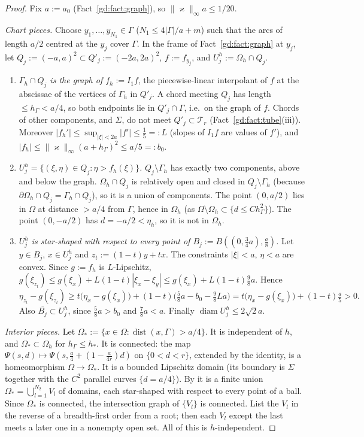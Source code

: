 \documentclass[11pt,reqno]{amsart}
\theoremstyle{plain}
\theoremstyle{definition}
\newcommand{\hG}{h_\Gamma}
\newcommand{\Gh}{\Gamma_h}
\newcommand{\Oh}{\Omega_h}
\newcommand{\norm}[1]{\lVert #1\rVert}
\DeclareMathOperator{\diam}{diam}
\DeclareMathOperator{\dist}{dist}
\newcommand{\kap}{\varkappa}            %
\newcommand{\kapi}{\norm{\kap}_\infty}
\newcommand{\Tr}{\mathcal T_r}
\begin{document}
\begin{proof}
Fix $a:=a_0$ (Fact~\ref{gd:fact:graph}), so $\kapi a\le1/20$.

\emph{Chart pieces.} Choose $y_1,\dots,y_{N_1}\in\Gamma$ ($N_1\le4|\Gamma|/a+m$) such that the arcs of length $a/2$ centred at the $y_j$ cover $\Gamma$. In the frame of Fact~\ref{gd:fact:graph} at $y_j$, let $Q_j:=(-a,a)^2\subset Q'_j:=(-2a,2a)^2$, $f:=f_{y_j}$, and $U_j^h:=\Oh\cap Q_j$.
\begin{enumerate}
\item \emph{$\Gh\cap Q_j$ is the graph of $f_h:=I_1f$}, the piecewise-linear interpolant of $f$ at the abscissae of the vertices of $\Gh$ in $Q'_j$. A chord meeting $Q_j$ has length $\le\hG<a/4$, so both endpoints lie in $Q'_j\cap\Gamma$, i.e.\ on the graph of $f$. Chords of other components, and $\Sigma$, do not meet $Q'_j\subset\Tr$ (Fact~\ref{gd:fact:tube}(iii)). Moreover $|f_h'|\le\sup_{|\xi|<2a}|f'|\le\frac15=:L$ (slopes of $I_1f$ are values of $f'$), and $|f_h|\le\kapi(a+\hG)^2\le a/5=:b_0$.
\item \emph{$U_j^h=\{(\xi,\eta)\in Q_j:\eta>f_h(\xi)\}$.} $Q_j\setminus\Gh$ has exactly two components, above and below the graph. $\Oh\cap Q_j$ is relatively open and closed in $Q_j\setminus\Gh$ (because $\partial\Oh\cap Q_j=\Gh\cap Q_j$), so it is a union of components. The point $(0,a/2)$ lies in $\Omega$ at distance $>a/4$ from $\Gamma$, hence in $\Oh$ (as $\Omega\setminus\Oh\subset\{d\le C\hG^2\}$). The point $(0,-a/2)$ has $d=-a/2<\eta_h$, so it is not in $\Oh$.
\item \emph{$U_j^h$ is star-shaped with respect to every point of $B_j:=B((0,\frac34a),\frac a8)$.} Let $y\in B_j$, $x\in U_j^h$ and $z_t:=(1-t)y+tx$. The constraints $|\xi|<a$, $\eta<a$ are convex. Since $g:=f_h$ is $L$-Lipschitz, $g(\xi_{z_t})\le g(\xi_x)+L(1-t)|\xi_x-\xi_y|\le g(\xi_x)+L(1-t)\tfrac98a$. Hence
\[
\eta_{z_t}-g(\xi_{z_t})\ge t\bigl(\eta_x-g(\xi_x)\bigr)+(1-t)\bigl(\tfrac58a-b_0-\tfrac98La\bigr)=t\bigl(\eta_x-g(\xi_x)\bigr)+(1-t)\tfrac a5>0 .
\]
Also $\overline{B_j}\subset U_j^h$, since $\frac58a>b_0$ and $\frac78a<a$. Finally $\diam U_j^h\le2\sqrt2a$.
\end{enumerate}

\emph{Interior pieces.} Let $\Omega_\ast:=\{x\in\Omega:\dist(x,\Gamma)>a/4\}$. It is independent of $h$, and $\Omega_\ast\subset\Oh$ for $\hG\le h_\ast$. It is connected: the map $\Psi(s,d)\mapsto\Psi(s,\frac a4+(1-\frac a{4r})d)$ on $\{0<d<r\}$, extended by the identity, is a homeomorphism $\Omega\to\Omega_\ast$. It is a bounded Lipschitz domain (its boundary is $\Sigma$ together with the $C^2$ parallel curves $\{d=a/4\}$). By \cite[Lemma~II.1.3]{Galdi} it is a finite union $\Omega_\ast=\bigcup_{l=1}^{N_2}V_l$ of domains, each star-shaped with respect to every point of a ball. Since $\Omega_\ast$ is connected, the intersection graph of $\{V_l\}$ is connected. List the $V_l$ in the reverse of a breadth-first order from a root; then each $V_l$ except the last meets a later one in a nonempty open set. All of this is $h$-independent.


\end{proof}
\end{document}

